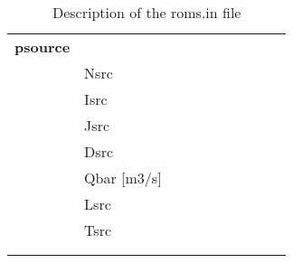 \begin{longtable}{|p{0.25\linewidth}|p{0.75\linewidth}|}
\large{\textbf{psource}} &     \\
& Nsrc   \\
& Isrc   \\
& Jsrc   \\
& Dsrc   \\
& Qbar [m3/s]   \\  
& Lsrc   \\      
& Tsrc   \\
&  \\ 
\hline
\caption{Description of the roms.in file}
\label{ta:desc_roms.in}
\end{longtable}

